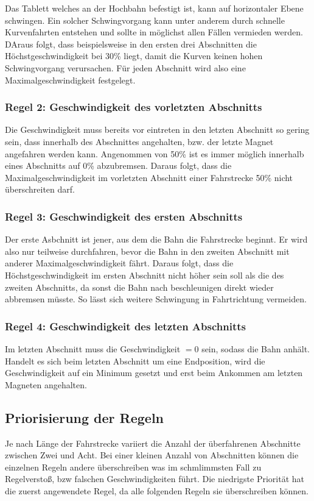 Das Tablett welches an der Hochbahn befestigt ist, kann auf horizontaler Ebene schwingen. Ein solcher Schwingvorgang kann unter anderem durch schnelle Kurvenfahrten entstehen und sollte in möglichst allen Fällen vermieden werden. DAraus folgt, dass beispielsweise in den ersten drei Abschnitten die Höchstgeschwindigkeit bei 30\% liegt, damit die Kurven keinen hohen Schwingvorgang verursachen. Für jeden Abschnitt wird also eine Maximalgeschwindigkeit festgelegt.

\subsubsection{Regel 2: Geschwindigkeit des vorletzten Abschnitts}
Die Geschwindigkeit muss bereits vor eintreten in den letzten Abschnitt so gering sein, dass innerhalb des Abschnittes angehalten, bzw. der letzte Magnet angefahren werden kann. Angenommen von 50\% ist es immer möglich innerhalb eines Abschnitts auf 0\% abzubremsen. Daraus folgt, dass die Maximalgeschwindigkeit im vorletzten Abschnitt einer Fahrstrecke 50\% nicht überschreiten darf. 

\subsubsection{Regel 3: Geschwindigkeit des ersten Abschnitts}
Der erste Asbchnitt ist jener, aus dem die Bahn die Fahrstrecke beginnt. Er wird also nur teilweise durchfahren, bevor die Bahn in den zweiten Abschnitt mit anderer Maximalgeschwindigkeit fährt. Daraus folgt, dass die Höchstgeschwindigkeit im ersten Abschnitt nicht höher sein soll als die des zweiten Abschnitts, da sonst die Bahn nach beschleunigen direkt wieder abbremsen müsste. So lässt sich weitere Schwingung in Fahrtrichtung vermeiden.

\subsubsection{Regel 4: Geschwindigkeit des letzten Abschnitts}
Im letzten Abschnitt muss die Geschwindigkeit $= 0$ sein, sodass die Bahn anhält. Handelt es sich beim letzten Abschnitt um eine Endposition, wird die Geschwindigkeit auf ein Minimum gesetzt und erst beim Ankommen am letzten Magneten angehalten.  

\subsection{Priorisierung der Regeln}
Je nach Länge der Fahrstrecke variiert die Anzahl der überfahrenen Abschnitte zwischen Zwei und Acht. Bei einer kleinen Anzahl von Abschnitten können die einzelnen Regeln andere überschreiben was im schmlimmsten Fall zu Regelverstoß, bzw falschen Geschwindigkeiten führt. Die niedrigste Priorität hat die zuerst angewendete Regel, da alle folgenden Regeln sie überschreiben können.

